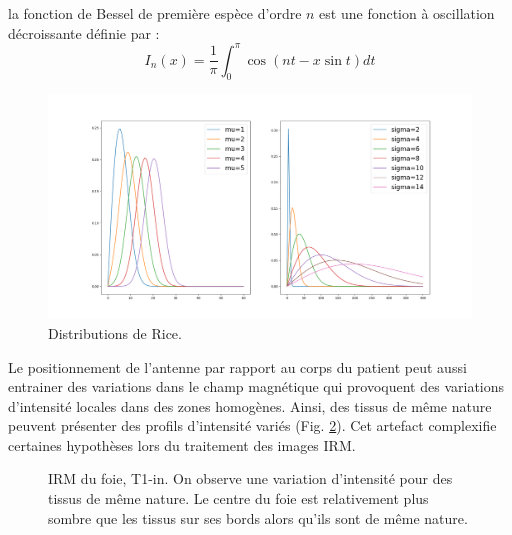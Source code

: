 la fonction de Bessel de première espèce d'ordre $n$ est une fonction à oscillation décroissante définie par :
\begin{equation}
I_n(x) = \frac{1}{\pi}\int_0^{\pi} \cos(nt - x\sin t) dt
\end{equation}
\begin{figure}
    \centering
    \includegraphics[width=\textwidth]{Images/noise_CT_2.png}
    \caption{Distributions de Rice. }
    \label{fig:MRI_Rice}
\end{figure}

Le positionnement de l'antenne par rapport au corps du patient peut aussi entrainer des variations dans le champ magnétique qui provoquent des variations d'intensité locales dans des zones homogènes. Ainsi, des tissus de même nature peuvent présenter des profils d'intensité variés (Fig. \ref{fig:MRI_variations}). Cet artefact complexifie certaines hypothèses lors du traitement des images IRM.
\begin{figure}
    \centering
    \caption{IRM du foie, T1-in. On observe une variation d'intensité pour des tissus de même nature. Le centre du foie est relativement plus sombre que les tissus sur ses bords alors qu'ils sont de même nature.}
    \label{fig:MRI_variations}
\end{figure}
